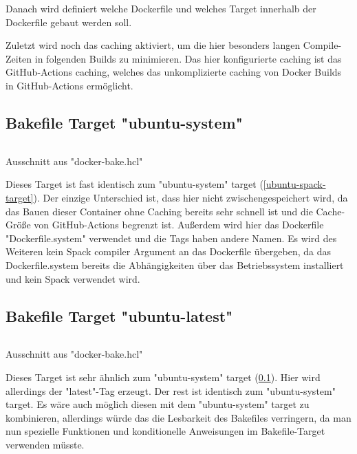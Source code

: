 Danach wird definiert welche Dockerfile und welches Target innerhalb der Dockerfile gebaut werden soll. 

Zuletzt wird noch das caching aktiviert, um die hier besonders langen Compile-Zeiten in folgenden Builds zu minimieren. Das hier konfigurierte caching ist das GitHub-Actions caching, welches das unkomplizierte caching von Docker Builds in GitHub-Actions ermöglicht.

\subsection{Bakefile Target "ubuntu-system"} \label{ubuntu-system-target}

\begin{listing}[H]
    \inputminted[firstline=30,lastline=44]{./lexers/docker-bake-lexer.py}{./code-examples/docker-bake.hcl}
    \caption{Ausschnitt aus "docker-bake.hcl"}
\end{listing}

Dieses Target ist fast identisch zum "ubuntu-system" target (\cref{ubuntu-spack-target}). Der einzige Unterschied ist, dass hier nicht zwischengespeichert wird, da das Bauen dieser Container ohne Caching bereits sehr schnell ist und die Cache-Größe von GitHub-Actions begrenzt ist. Außerdem wird hier das Dockerfile "Dockerfile.system" verwendet und die Tags haben andere Namen. Es wird des Weiteren kein Spack compiler Argument an das Dockerfile übergeben, da das Dockerfile.system bereits die Abhängigkeiten über das Betriebssystem installiert und kein Spack verwendet wird. 


\subsection{Bakefile Target "ubuntu-latest"}

\begin{listing}[H]
    \inputminted[firstline=47,lastline=56]{./lexers/docker-bake-lexer.py}{./code-examples/docker-bake.hcl}
    \caption{Ausschnitt aus "docker-bake.hcl"}
\end{listing}


Dieses Target ist sehr ähnlich zum "ubuntu-system" target (\cref{ubuntu-system-target}). Hier wird allerdings der "latest"-Tag erzeugt. 
Der rest ist identisch zum "ubuntu-system" target. Es wäre auch möglich diesen mit dem "ubuntu-system" target zu kombinieren, allerdings würde das die Lesbarkeit des Bakefiles verringern, da man nun spezielle Funktionen und konditionelle Anweisungen im Bakefile-Target verwenden müsste.



